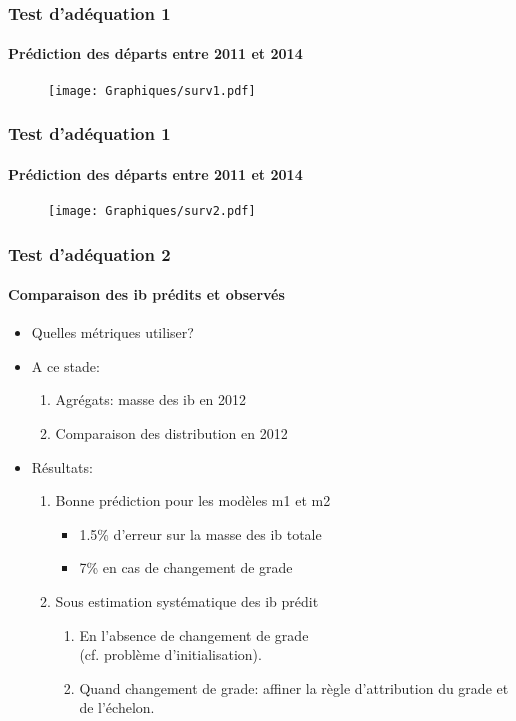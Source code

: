 \documentclass[xcolor=table,ignorenonframetext,12pt]{beamer}
\begin{document}
\begin{frame}
\frametitle{Test d'adéquation 1}
\framesubtitle{Prédiction des départs entre 2011 et 2014}
\begin{figure}
	\vspace{-0.5cm}
	\texttt{[image: Graphiques/surv1.pdf]}
\end{figure}

\end{frame}


\begin{frame}
\frametitle{Test d'adéquation 1}
\framesubtitle{Prédiction des départs entre 2011 et 2014}
\begin{figure}
	\vspace{-0.5cm}
	\texttt{[image: Graphiques/surv2.pdf]}
\end{figure}

\end{frame}


\begin{frame}
\frametitle{Test d'adéquation 2}
\framesubtitle{Comparaison des ib prédits et observés}

\begin{itemize}

\item Quelles métriques utiliser? 
\item A ce stade: 
\begin{enumerate}
\item Agrégats: masse des ib en 2012
\item Comparaison des distribution en 2012
\end{enumerate}

\vspace{0.2cm}
\item Résultats:
\begin{enumerate}
\item Bonne prédiction pour les modèles m1 et m2 
\begin{itemize}
\item 1.5\% d'erreur sur la masse des ib totale
\item 7\% en cas de changement de grade
\end{itemize}
\item Sous estimation systématique des ib prédit 
\begin{enumerate}
\item En l'absence de changement de grade \\ (cf. problème d'initialisation).
\item Quand changement de grade: affiner la règle d'attribution du grade et de l'échelon.
\end{enumerate}

\end{enumerate}

\end{itemize}

\end{frame}
\end{document}
